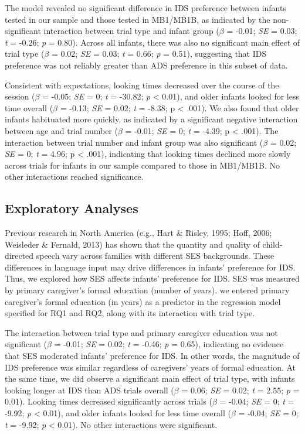 \documentclass[
  ,man,floatsintext]{apa6}
\begin{document}
The model revealed no significant difference in IDS preference between infants tested in our sample and those tested in MB1/MB1B, as indicated by the non-significant interaction between trial type and infant group (\emph{\(\beta\)} = -0.01; \emph{SE} = 0.03; \emph{t} = -0.26; \emph{p} = 0.80). Across all infants, there was also no significant main effect of trial type (\emph{\(\beta\)} = 0.02; \emph{SE} = 0.03; \emph{t} = 0.66; \emph{p} = 0.51), suggesting that IDS preference was not reliably greater than ADS preference in this subset of data.

Consistent with expectations, looking times decreased over the course of the session (\emph{\(\beta\)} = -0.05; \emph{SE} = 0; \emph{t} = -30.82; \emph{p} \textless{} 0.01), and older infants looked for less time overall (\emph{\(\beta\)} = -0.13; \emph{SE} = 0.02; \emph{t} = -8.38; p \textless{} .001). We also found that older infants habituated more quickly, as indicated by a significant negative interaction between age and trial number (\emph{\(\beta\)} = -0.01; \emph{SE} = 0; \emph{t} = -4.39; p \textless{} .001). The interaction between trial number and infant group was also significant (\emph{\(\beta\)} = 0.02; \emph{SE} = 0; \emph{t} = 4.96; p \textless{} .001), indicating that looking times declined more slowly across trials for infants in our sample compared to those in MB1/MB1B. No other interactions reached significance.

\hypertarget{exploratory-analyses}{%
\subsection{Exploratory Analyses}\label{exploratory-analyses}}

Previous research in North America (e.g., Hart \& Risley, 1995; Hoff, 2006; Weisleder \& Fernald, 2013) has shown that the quantity and quality of child-directed speech vary across families with different SES backgrounds. These differences in language input may drive differences in infants' preference for IDS. Thus, we explored how SES affects infants' preference for IDS. SES was measured by primary caregiver's formal education (number of years). we entered primary caregiver's formal education (in years) as a predictor in the regression model specified for RQ1 and RQ2, along with its interaction with trial type.

The interaction between trial type and primary caregiver education was not significant (\emph{\(\beta\)} = -0.01; \emph{SE} = 0.02; \emph{t} = -0.46; \emph{p} = 0.65), indicating no evidence that SES moderated infants' preference for IDS. In other words, the magnitude of IDS preference was similar regardless of caregivers' years of formal education. At the same time, we did observe a significant main effect of trial type, with infants looking longer at IDS than ADS trials overall (\emph{\(\beta\)} = 0.06; \emph{SE} = 0.02; \emph{t} = 2.55; \emph{p} = 0.01). Looking times decreased significantly across trials (\emph{\(\beta\)} = -0.04; \emph{SE} = 0; \emph{t} = -9.92; \emph{p} \textless{} 0.01), and older infants looked for less time overall (\emph{\(\beta\)} = -0.04; \emph{SE} = 0; \emph{t} = -9.92; \emph{p} \textless{} 0.01). No other interactions were significant.
\end{document}
